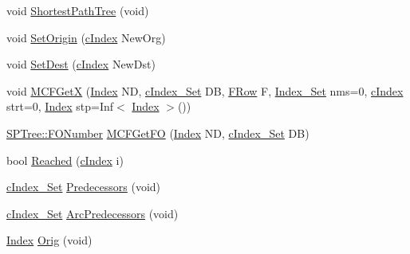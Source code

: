 \begin{DoxyCompactItemize}
\item 
void \mbox{\hyperlink{class_s_p_tree_a76e377a946e5a08dba5172117eaf68a8}{Shortest\+Path\+Tree}} (void)
\item 
void \mbox{\hyperlink{class_s_p_tree_a90071ff5bdcd7e73fe156180fe7ffcee}{Set\+Origin}} (\mbox{\hyperlink{class_m_c_f_class_a76aaabb20535c51a2752b93f6c38fe54}{c\+Index}} New\+Org)
\item 
void \mbox{\hyperlink{class_s_p_tree_a1fad8461dbf04f0981f698a4d1b9fbd9}{Set\+Dest}} (\mbox{\hyperlink{class_m_c_f_class_a76aaabb20535c51a2752b93f6c38fe54}{c\+Index}} New\+Dst)
\item 
void \mbox{\hyperlink{class_s_p_tree_afe1dba1878b1ac62056bbba3368e23f6}{M\+C\+F\+GetX}} (\mbox{\hyperlink{class_m_c_f_class_ad53d6229d7ec28555a9c9c2fd9abf773}{Index}} ND, \mbox{\hyperlink{class_m_c_f_class_a81575b2d4e4d5636b17170432150ae69}{c\+Index\+\_\+\+Set}} DB, \mbox{\hyperlink{class_m_c_f_class_a9dae1f1a39c208ce3c2b337cd5bb3d00}{F\+Row}} F, \mbox{\hyperlink{class_m_c_f_class_ace3388eb329ff0551a0b86b6c67e33d8}{Index\+\_\+\+Set}} nms=0, \mbox{\hyperlink{class_m_c_f_class_a76aaabb20535c51a2752b93f6c38fe54}{c\+Index}} strt=0, \mbox{\hyperlink{class_m_c_f_class_ad53d6229d7ec28555a9c9c2fd9abf773}{Index}} stp=Inf$<$ \mbox{\hyperlink{class_m_c_f_class_ad53d6229d7ec28555a9c9c2fd9abf773}{Index}} $>$())
\item 
\mbox{\hyperlink{class_m_c_f_class_af5ee7b3099b0bc780a6a4b43629488fa}{S\+P\+Tree\+::\+F\+O\+Number}} \mbox{\hyperlink{class_s_p_tree_a412b2a0ccb6e2faacb7c2e5081d4e016}{M\+C\+F\+Get\+FO}} (\mbox{\hyperlink{class_m_c_f_class_ad53d6229d7ec28555a9c9c2fd9abf773}{Index}} ND, \mbox{\hyperlink{class_m_c_f_class_a81575b2d4e4d5636b17170432150ae69}{c\+Index\+\_\+\+Set}} DB)
\item 
bool \mbox{\hyperlink{class_s_p_tree_a451041eba0632676692f2de798bea4d7}{Reached}} (\mbox{\hyperlink{class_m_c_f_class_a76aaabb20535c51a2752b93f6c38fe54}{c\+Index}} i)
\item 
\mbox{\hyperlink{class_m_c_f_class_a81575b2d4e4d5636b17170432150ae69}{c\+Index\+\_\+\+Set}} \mbox{\hyperlink{class_s_p_tree_af95a85d44e57ab53fe2b565355f6c054}{Predecessors}} (void)
\item 
\mbox{\hyperlink{class_m_c_f_class_a81575b2d4e4d5636b17170432150ae69}{c\+Index\+\_\+\+Set}} \mbox{\hyperlink{class_s_p_tree_aaccf9d3766b10881f0b92387e3a9f914}{Arc\+Predecessors}} (void)
\item 
\mbox{\hyperlink{class_m_c_f_class_ad53d6229d7ec28555a9c9c2fd9abf773}{Index}} \mbox{\hyperlink{class_s_p_tree_ae75a8a94d994b6a98934b241c969bdc6}{Orig}} (void)

\end{DoxyCompactItemize}
